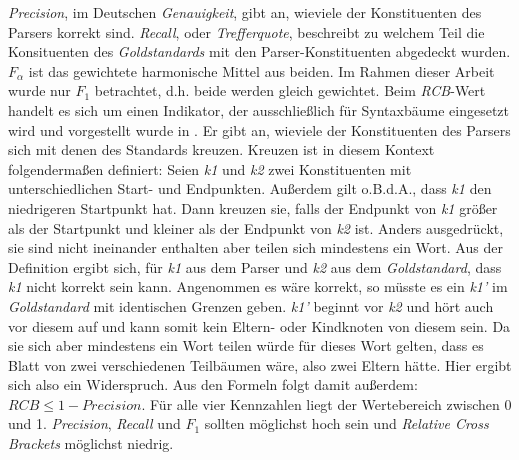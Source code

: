 \textit{Precision}, im Deutschen \textit{Genauigkeit}, gibt an, wieviele der Konstituenten des Parsers korrekt sind. \textit{Recall}, oder \textit{Trefferquote}, beschreibt zu welchem Teil die Konsituenten des \textit{Goldstandards} mit den Parser-Konstituenten abgedeckt wurden. \(F_\alpha\) ist das gewichtete harmonische Mittel aus beiden. Im Rahmen dieser Arbeit wurde nur \(F_1\) betrachtet, d.h. beide werden gleich gewichtet. Beim \textit{RCB}-Wert handelt es sich um einen Indikator, der ausschließlich für Syntaxbäume eingesetzt wird und vorgestellt wurde in \cite{crossbrackets}. Er gibt an, wieviele der Konstituenten des Parsers sich mit denen des Standards kreuzen. Kreuzen ist in diesem Kontext folgendermaßen definiert: Seien \textit{k1} und \textit{k2} zwei Konstituenten mit unterschiedlichen Start- und Endpunkten. Außerdem gilt o.B.d.A., dass \textit{k1} den niedrigeren Startpunkt hat. Dann kreuzen sie, falls der Endpunkt von \textit{k1} größer als der Startpunkt und kleiner als der Endpunkt von \textit{k2} ist. Anders ausgedrückt, sie sind nicht ineinander enthalten aber teilen sich mindestens ein Wort. %
Aus der Definition ergibt sich, für \textit{k1} aus dem Parser und \textit{k2} aus dem \textit{Goldstandard}, dass \textit{k1} nicht korrekt sein kann. Angenommen es wäre korrekt, so müsste es ein \textit{k1'} im \textit{Goldstandard} mit identischen Grenzen geben. \textit{k1'} beginnt vor \textit{k2} und hört auch vor diesem auf und kann somit kein Eltern- oder Kindknoten von diesem sein. Da sie sich aber mindestens ein Wort teilen würde für dieses Wort gelten, dass es Blatt von zwei verschiedenen Teilbäumen wäre, also zwei Eltern hätte. Hier ergibt sich also ein Widerspruch. Aus den Formeln folgt damit außerdem: \( RCB \leq 1 - Precision \). Für alle vier Kennzahlen liegt der Wertebereich zwischen 0 und 1. \textit{Precision}, \textit{Recall} und \(F_1\) sollten möglichst hoch sein und \textit{Relative Cross Brackets} möglichst niedrig.